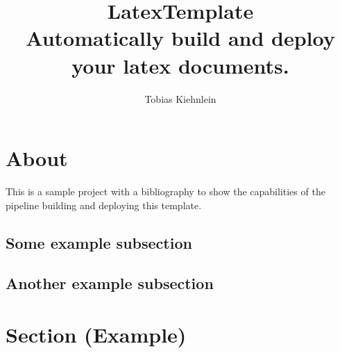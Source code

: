 \documentclass[
    a4paper,         %
    10pt,            %
    oneside,         %
    headsepline,     %
    notitlepage      %
]{extarticle}
\author{Tobias Kiehnlein}
\title{\textbf{LatexTemplate}\\\large{Automatically build and deploy your latex documents.}}
\date{}
\begin{document}
    \pagestyle{empty}
    \maketitle
    \tableofcontents
    \newpage
    \pagestyle{headings}

    \section{About}
    This is a sample project with a bibliography to show the capabilities of the pipeline building and deploying this template.\cite{latexTemplate}

    \subsection{Some example subsection}
    \subsection{Another example subsection}

    \section{Section (Example)}

    \newpage
    \printbibliography[heading=bibintoc]
    \newpage
    \listoffigures
\end{document}
